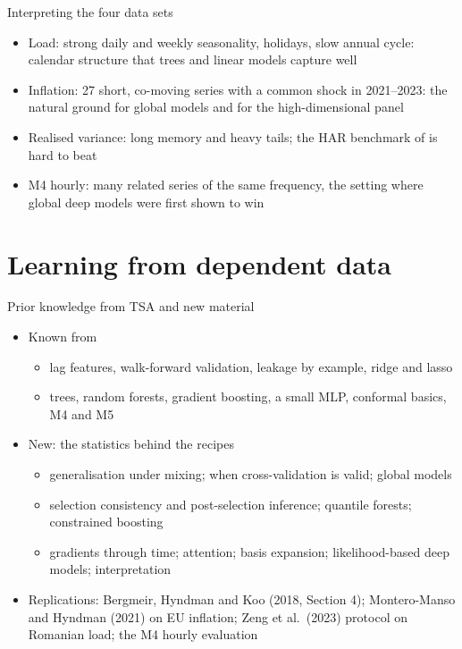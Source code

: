 \begin{frame}{Interpreting the four data sets}
\itemsize{\small}
\begin{itemize}
    \item Load: strong daily and weekly seasonality, holidays, slow annual cycle: calendar structure that trees and linear models capture well
    \item Inflation: 27 short, co-moving series with a common shock in 2021--2023: the natural ground for global models and for the high-dimensional panel
    \item Realised variance: long memory and heavy tails; the HAR benchmark of  is hard to beat
    \item M4 hourly: many related series of the same frequency, the setting where global deep models were first shown to win
\end{itemize}
\end{frame}


\section{Learning from dependent data}

\begin{frame}{Prior knowledge from TSA and new material}
\itemsize{\small}
\begin{itemize}
    \item Known from 
    \begin{itemize}
        \item lag features, walk-forward validation, leakage by example, ridge and lasso
        \item trees, random forests, gradient boosting, a small MLP, conformal basics, M4 and M5
    \end{itemize}
    \item New: the statistics behind the recipes
    \begin{itemize}
        \item generalisation under mixing; when cross-validation is valid; global models
        \item selection consistency and post-selection inference; quantile forests; constrained boosting
        \item gradients through time; attention; basis expansion; likelihood-based deep models; interpretation
    \end{itemize}
    \item Replications: Bergmeir, Hyndman and Koo (2018, Section 4); Montero-Manso and Hyndman (2021) on EU inflation; Zeng et al.\ (2023) protocol on Romanian load; the M4 hourly evaluation
\end{itemize}
\end{frame}

